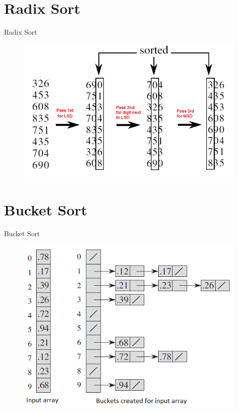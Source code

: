 \documentclass{beamer}
\begin{document}
\section{Radix Sort}
\begin{frame}{Radix Sort}
    \begin{figure}[h]
        \includegraphics[width=\textwidth]{radix/radix}
    \end{figure}
\end{frame}
\section{Bucket Sort}
\begin{frame}{Bucket Sort}
    \begin{figure}[h]
        \includegraphics{bucket/bucket}
    \end{figure}
\end{frame}
\end{document}
